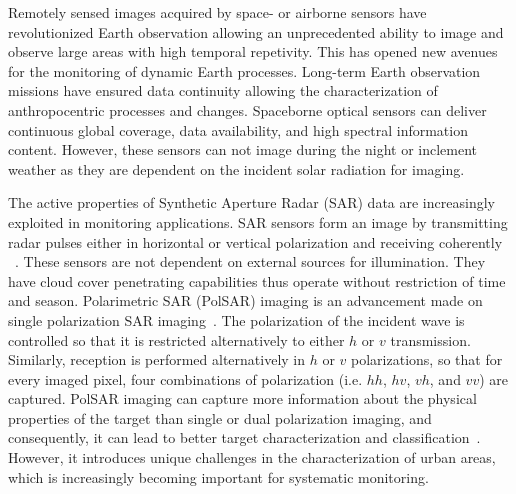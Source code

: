 





Remotely sensed images acquired by space- or airborne sensors have revolutionized Earth observation allowing an unprecedented ability to image and observe large areas with high temporal repetivity. 
This has opened new avenues for the monitoring of dynamic Earth processes. Long-term Earth observation missions have ensured data continuity allowing the characterization of anthropocentric processes and changes. Spaceborne optical sensors can deliver continuous global coverage, data availability, and high spectral information content. However, these sensors can not image during the night or inclement weather as they are dependent on the incident solar radiation for imaging. 

The active properties of Synthetic Aperture Radar (SAR) data are increasingly exploited in monitoring applications. SAR sensors form an image by transmitting radar pulses  either in horizontal or vertical polarization and receiving coherently ~\cite{curlander1991synthetic}.  These sensors are not dependent on external sources for illumination. They have cloud cover penetrating capabilities thus operate without restriction of time and season.  Polarimetric SAR (PolSAR) imaging is an advancement made on single polarization SAR imaging~\cite{van1992nasa}. The polarization of the incident wave is controlled so that it is restricted alternatively to either $h$ or $v$ transmission. Similarly, reception is performed alternatively in $h$ or $v$ polarizations, so that for every imaged pixel, four combinations of polarization (i.e. $hh$, $hv$, $vh$, and $vv$) are captured. PolSAR imaging can capture more information about the physical properties of the target than single or dual polarization imaging, and consequently, it can lead to better target characterization and classification~\cite{Lee2001multipolclass}. However, it introduces unique challenges in the characterization of urban areas, which is increasingly becoming important for systematic monitoring.

